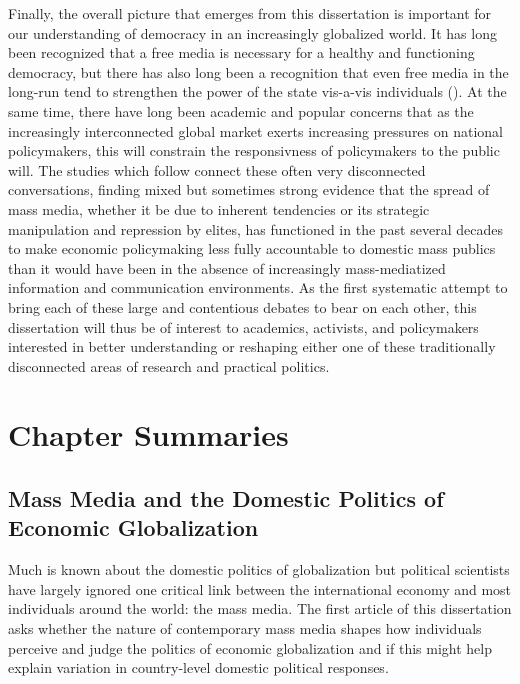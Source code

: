 \documentclass[12pt]{report}
\begin{document}
Finally, the overall picture that emerges from this dissertation is important for our understanding of democracy in an increasingly globalized world. It has long been recognized that a free media is necessary for a healthy and functioning democracy, but there has also long been a recognition that even free media in the long-run tend to strengthen the power of the state vis-a-vis individuals (\citealt{Deutsch:1953ww,Deutsch:1966ux,Camber:2013ul}). At the same time, there have long been academic and popular concerns that as the increasingly interconnected global market exerts increasing pressures on national policymakers, this will constrain the responsivness of policymakers to the public will. The studies which follow connect these often very disconnected conversations, finding mixed but sometimes strong evidence that the spread of mass media, whether it be due to inherent tendencies or its strategic manipulation and repression by elites, has functioned in the past several decades to make economic policymaking less fully accountable to domestic mass publics than it would have been in the absence of increasingly mass-mediatized information and communication environments. As the first systematic attempt to bring each of these large and contentious debates to bear on each other, this dissertation will thus be of interest to academics, activists, and policymakers interested in better understanding or reshaping either one of these traditionally disconnected areas of research and practical politics. 

\section{Chapter Summaries}

\subsection{Mass Media and the Domestic Politics of Economic Globalization}

Much is known about the domestic politics of globalization but political scientists
have largely ignored one critical link between the international economy and most individuals around
the world: the mass media. The first article of this dissertation asks whether the nature of contemporary mass media shapes how individuals perceive and judge the politics of economic globalization and if this might help explain variation in country-level domestic political responses.
\end{document}

